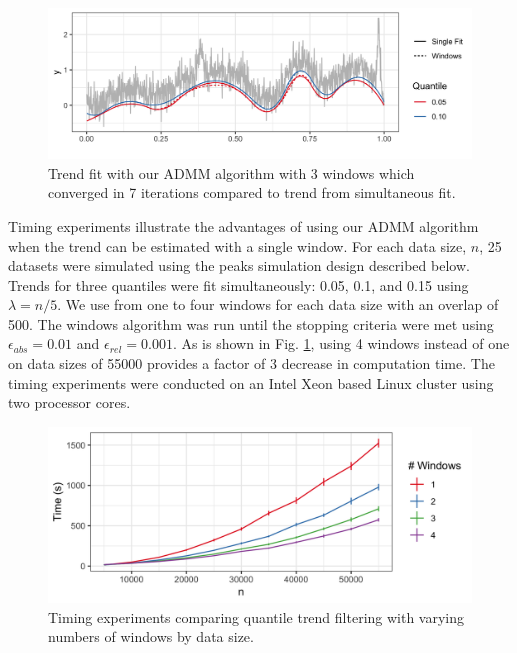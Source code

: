 \documentclass[12pt]{article}
\begin{document}
	
	\begin{figure}
		\centering
		\includegraphics[width = 0.8\linewidth]{Figures/admm_windows.png}
		\caption{Trend fit with our ADMM algorithm with 3 windows which converged in 7 iterations compared to trend from simultaneous fit.}
	\end{figure}

	Timing experiments illustrate the advantages of using our ADMM algorithm when the trend can be estimated with a single window. For each data size, $n$, 25 datasets were simulated using the peaks simulation design described below. Trends for three quantiles were fit simultaneously: 0.05, 0.1, and 0.15 using $\lambda = n/5$. We use from one to four windows for each data size with an overlap of 500. The windows algorithm was run until the stopping criteria were met using $\epsilon_{abs} = 0.01$ and $\epsilon_{rel} = 0.001$. As is shown in Fig. \ref{fig:timing}, using 4 windows instead of one on data sizes of 55000 provides a factor of 3 decrease in computation time. The timing experiments were conducted on an Intel Xeon based Linux cluster using two processor cores.   
	
	\begin{figure}[!h] 
		\centering
		\includegraphics[width = 0.7\linewidth]{Figures/Fig_timing_experiment.png}
		\caption{Timing experiments comparing quantile trend filtering with varying numbers of windows by data size.}
		\label{fig:timing}
	\end{figure}
\end{document}
